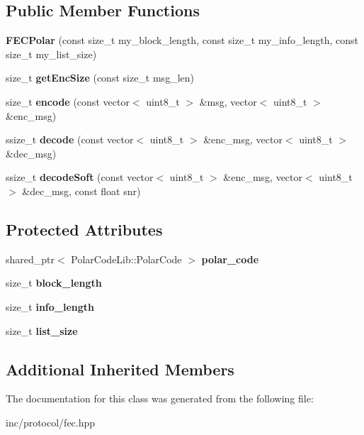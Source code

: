 \subsection*{Public Member Functions}
\begin{DoxyCompactItemize}
\item 
\mbox{\label{classFECPolar_a7c62c4474b6a7ecd9dc897329e864096}} 
{\bfseries F\+E\+C\+Polar} (const size\+\_\+t my\+\_\+block\+\_\+length, const size\+\_\+t my\+\_\+info\+\_\+length, const size\+\_\+t my\+\_\+list\+\_\+size)
\item 
\mbox{\label{classFECPolar_a8589865e91e8ef0eed7bb440a445eb99}} 
size\+\_\+t {\bfseries get\+Enc\+Size} (const size\+\_\+t msg\+\_\+len)
\item 
\mbox{\label{classFECPolar_ab5662e1c2d45aa924936969261eb6faf}} 
size\+\_\+t {\bfseries encode} (const vector$<$ uint8\+\_\+t $>$ \&msg, vector$<$ uint8\+\_\+t $>$ \&enc\+\_\+msg)
\item 
\mbox{\label{classFECPolar_adcf71d5e725bffa9b6e4c776eb8d4760}} 
ssize\+\_\+t {\bfseries decode} (const vector$<$ uint8\+\_\+t $>$ \&enc\+\_\+msg, vector$<$ uint8\+\_\+t $>$ \&dec\+\_\+msg)
\item 
\mbox{\label{classFECPolar_a897d3f06d446bf82f553d966a4725e6c}} 
ssize\+\_\+t {\bfseries decode\+Soft} (const vector$<$ uint8\+\_\+t $>$ \&enc\+\_\+msg, vector$<$ uint8\+\_\+t $>$ \&dec\+\_\+msg, const float snr)
\end{DoxyCompactItemize}
\subsection*{Protected Attributes}
\begin{DoxyCompactItemize}
\item 
\mbox{\label{classFECPolar_aa919bab40c4d8d1c2fe86dea70b6e73b}} 
shared\+\_\+ptr$<$ Polar\+Code\+Lib\+::\+Polar\+Code $>$ {\bfseries polar\+\_\+code}
\item 
\mbox{\label{classFECPolar_ab7147d119e70f8544871358e5520ac3f}} 
size\+\_\+t {\bfseries block\+\_\+length}
\item 
\mbox{\label{classFECPolar_ae2639cda67ff123d5b523ac6a2c242a0}} 
size\+\_\+t {\bfseries info\+\_\+length}
\item 
\mbox{\label{classFECPolar_a84f2200d4fa1b44d67ae5c06d03116bc}} 
size\+\_\+t {\bfseries list\+\_\+size}
\end{DoxyCompactItemize}
\subsection*{Additional Inherited Members}


The documentation for this class was generated from the following file\+:\begin{DoxyCompactItemize}
\item 
inc/protocol/fec.\+hpp\end{DoxyCompactItemize}
